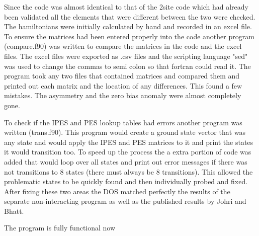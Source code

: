 \documentclass{article}
\begin{document}
Since the code was almost identical to that of the 2site code which had already been validated all the elements that were different between the two were checked. The hamiltonians were initially calculated by hand and recorded in an excel file. To ensure the matrices had been entered properly into the code another program (compare.f90) was written to compare the matrices in the code and the excel files. The excel files were exported as .csv files and the scripting language "sed" was used to change the commas to semi colon so that fortran could read it. The program took any two files that contained matrices and compared them and printed out each matrix and the location of any differences. This found a few mistakes. The asymmetry and the zero bias anomaly were almost completely gone.

To check if the IPES and PES lookup tables had errors another program was written (trans.f90). This program would create a ground state vector that was any state and would apply the IPES and PES matrices to it and print the states it would transition too. To speed up the process the a extra portion of code was added that would loop over all states and print out error messages if there was not transitions to 8 states (there must always be 8 transitions). This allowed the problematic states to be quickly found and then individually probed and fixed. After fixing these two areas the DOS matched perfectly the results of the separate non-interacting program as well as the published results by Johri and Bhatt.

The program is fully functional now
\end{document}
